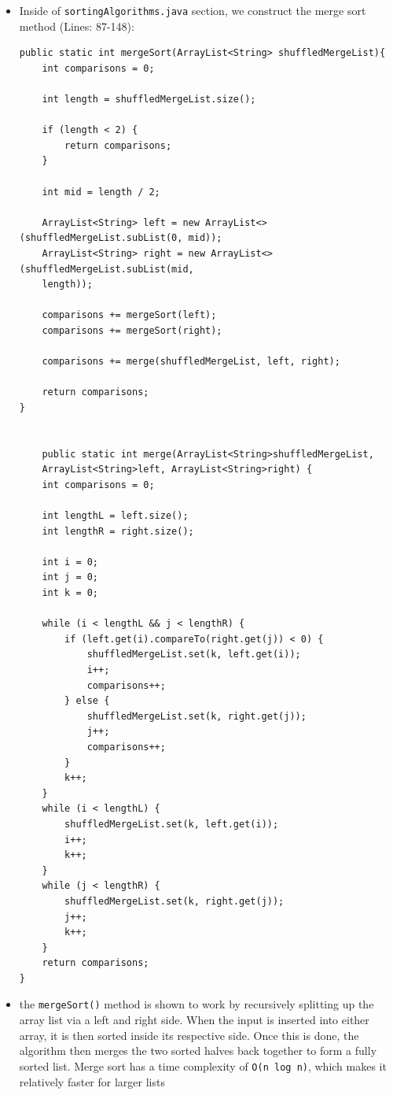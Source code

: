 \documentclass[a4paper,12pt]{article}
\begin{document}
\begin{itemize}
\item Inside of \verb|sortingAlgorithms.java| section, we construct the merge sort method (Lines: 87-148):

\begin{verbatim}
public static int mergeSort(ArrayList<String> shuffledMergeList){
    int comparisons = 0;
    
    int length = shuffledMergeList.size();
    
    if (length < 2) {
        return comparisons;
    }
    
    int mid = length / 2;
    
    ArrayList<String> left = new ArrayList<>(shuffledMergeList.subList(0, mid)); 
    ArrayList<String> right = new ArrayList<>(shuffledMergeList.subList(mid, 
    length));
    
    comparisons += mergeSort(left);
    comparisons += mergeSort(right);
    
    comparisons += merge(shuffledMergeList, left, right);
    
    return comparisons;
}
    
    
    public static int merge(ArrayList<String>shuffledMergeList, 
    ArrayList<String>left, ArrayList<String>right) {
    int comparisons = 0;
    
    int lengthL = left.size();
    int lengthR = right.size();
    
    int i = 0;
    int j = 0;
    int k = 0;
    
    while (i < lengthL && j < lengthR) { 
        if (left.get(i).compareTo(right.get(j)) < 0) {
            shuffledMergeList.set(k, left.get(i));
            i++; 
            comparisons++;
        } else {
            shuffledMergeList.set(k, right.get(j));
            j++;
            comparisons++;
        }
        k++;
    }
    while (i < lengthL) {
        shuffledMergeList.set(k, left.get(i));
        i++;
        k++;
    }
    while (j < lengthR) {
        shuffledMergeList.set(k, right.get(j));
        j++;
        k++;
    }
    return comparisons;
}
\end{verbatim}
\item the \verb|mergeSort()| method is shown to work by recursively splitting up the array list via a left and right side. When the input is inserted into either array, it is then sorted inside its respective side. Once this is done, the algorithm then merges the two sorted halves back together to form a fully sorted list. Merge sort has a time complexity of \verb|O(n log n)|, which makes it relatively faster for larger lists\\

\end{itemize}
\end{document}
